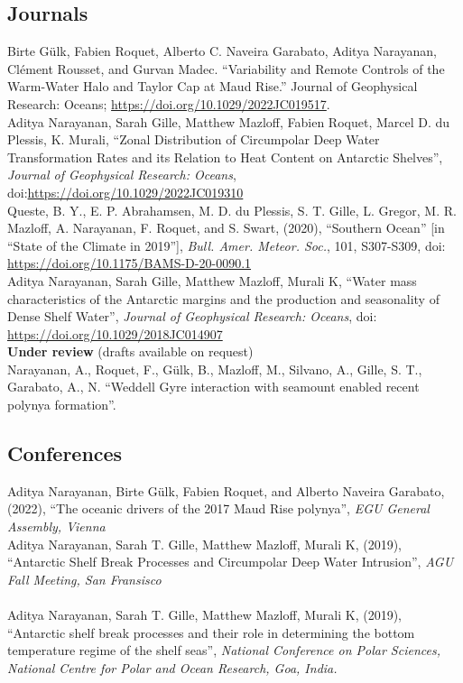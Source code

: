 \documentclass[12pt, a4paper]{article}
\newcommand{\years}[1]{\marginnote{\small #1}}
\begin{document}
\subsection*{\bf Journals}
\years{2023} Birte Gülk, Fabien Roquet, Alberto C. Naveira Garabato, Aditya Narayanan, Clément Rousset, and Gurvan Madec. “Variability and Remote Controls of the Warm-Water Halo and Taylor Cap at Maud Rise.” Journal of Geophysical Research: Oceans; \url{https://doi.org/10.1029/2022JC019517}.\\
\years{2023} Aditya Narayanan, Sarah Gille, Matthew Mazloff, Fabien Roquet, Marcel D. du Plessis, K. Murali, ``Zonal Distribution of Circumpolar Deep Water Transformation Rates and its Relation to Heat Content on Antarctic Shelves'', \emph{Journal of Geophysical Research: Oceans}, doi:\url{https://doi.org/10.1029/2022JC019310}\\
\years{2020} Queste, B. Y., E. P. Abrahamsen, M. D. du Plessis, S. T. Gille, L. Gregor, M. R. Mazloff, A. Narayanan, F. Roquet, and S. Swart, (2020), ``Southern Ocean'' [in ``State of the Climate in 2019''], \emph{Bull. Amer. Meteor. Soc.}, 101, S307-S309, doi: \url{https://doi.org/10.1175/BAMS-D-20-0090.1}\\
\years{2019}Aditya Narayanan, Sarah Gille, Matthew Mazloff, Murali K, ``Water mass characteristics of the Antarctic margins and the production and seasonality of Dense Shelf Water'', \emph{Journal of Geophysical Research: Oceans}, doi: \url{https://doi.org/10.1029/2018JC014907}\\


{\bf Under review} (drafts available on request)\\

\years{2022} Narayanan, A., Roquet, F., G\"ulk, B., Mazloff, M., Silvano, A., Gille, S. T., Garabato, A., N. ``Weddell Gyre interaction with seamount enabled recent polynya formation''.\\



\subsection*{\bf Conferences}
\years{2022}Aditya Narayanan, Birte G\"ulk, Fabien Roquet, and Alberto Naveira Garabato, (2022), ``The oceanic drivers of the 2017 Maud Rise polynya'', \emph{EGU General Assembly, Vienna}\\
\years{2019}Aditya Narayanan, Sarah T. Gille, Matthew Mazloff, Murali K, (2019), ``Antarctic Shelf Break Processes and Circumpolar Deep Water Intrusion'', \emph{AGU Fall Meeting, San Fransisco}\\
\\
\years{2019}Aditya Narayanan, Sarah T. Gille, Matthew Mazloff, Murali K, (2019), ``Antarctic shelf break processes and their role in determining the bottom temperature regime of the shelf seas'', \emph{National Conference on Polar Sciences, National Centre for Polar and Ocean Research, Goa, India.}\\
\end{document}
